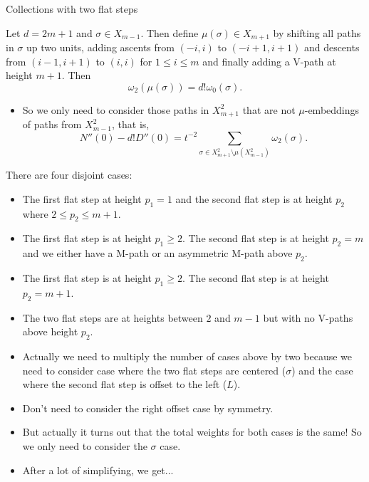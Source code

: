 \documentclass[12pt]{beamer}
\begin{document}
\begin{frame}[allowframebreaks]{Collections with two flat steps}
\begin{lemma}[Willerton]
Let $d = 2m+1$ and $\sigma \in X_{m-1}$. Then define $\mu(\sigma)\in X_{m+1}$ by shifting all paths in $\sigma$ up two units, adding ascents from $(-i,i)$ to $(-i+1,i+1)$ and descents from $(i-1,i+1)$ to $(i,i)$ for $1\leq i \leq m$ and finally adding a V-path at height $m+1$. Then
\begin{equation*}
\omega_2(\mu(\sigma)) = d!\omega_0(\sigma).
\end{equation*}
\end{lemma}

\framebreak

\begin{itemize}
\item So we only need to consider those paths in $X_{m+1}^2$ that are not $\mu$-embeddings of paths from $X_{m-1}^2$, that is,
\begin{equation*}
N''(0)-d!D''(0) = t^{-2}\sum\limits_{\sigma\in X_{m+1}^2\setminus\mu(X_{m-1}^2)}\omega_2(\sigma).
\end{equation*}
\end{itemize}

\framebreak

There are four disjoint cases:
\begin{itemize}
\item The first flat step at height $p_1=1$ and the second flat step is at height $p_2$ where $2\leq p_2\leq m+1$.
\item The first flat step is at height $p_1 \geq 2$. The second flat step is at height $p_2 = m$ and we either have a M-path or an asymmetric M-path above $p_2$.
\item The first flat step is at height $p_1 \geq 2$. The second flat step is at height $p_2 = m+1$.
\item The two flat steps are at heights between $2$ and $m-1$ but with no V-paths above height $p_2$.
\end{itemize}

\framebreak

\begin{itemize}
\item Actually we need to multiply the number of cases above by two because we need to consider case where the two flat steps are centered ($\sigma$) and the case where the second flat step is offset to the left ($L$).
\item Don't need to consider the right offset case by symmetry.
\item But actually it turns out that the total weights for both cases is the same! So we only need to consider the $\sigma$ case.
\item After a lot of simplifying, we get...
\end{itemize}

\end{frame}
\end{document}
